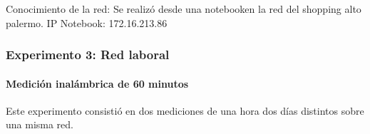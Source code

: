 Conocimiento de la red:
Se realizó desde una notebooken la red del shopping alto palermo.
IP Notebook: 172.16.213.86

\subsubsection{Experimento 3: Red laboral}
\paragraph{Medición inalámbrica de 60 minutos}

Este experimento consistió en dos mediciones de una hora dos días distintos sobre una misma red.
